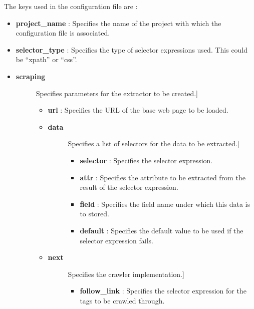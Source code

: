 \documentclass[letterpaper,12pt,english]{sphinxmanual}
\begin{document}
The keys used in the configuration file are :
\begin{itemize}
\item {} 
\textbf{project\_name} : Specifies the name of the project with which the configuration file is associated.

\item {} 
\textbf{selector\_type} : Specifies the type of selector expressions used. This could be ``xpath'' or ``css''.

\item {} \begin{description}
\item[{\textbf{scraping}}] \leavevmode{[}Specifies parameters for the extractor to be created.{]}\begin{itemize}
\item {} 
\textbf{url} : Specifies the URL of the base web page to be loaded.

\item {} \begin{description}
\item[{\textbf{data}}] \leavevmode{[}Specifies a list of selectors for the data to be extracted.{]}\begin{itemize}
\item {} 
\textbf{selector} : Specifies the selector expression.

\item {} 
\textbf{attr} : Specifies the attribute to be extracted from the result of the selector expression.

\item {} 
\textbf{field} : Specifies the field name under which this data is to stored.

\item {} 
\textbf{default} : Specifies the default value to be used if the selector expression fails.

\end{itemize}

\end{description}

\item {} \begin{description}
\item[{\textbf{next}}] \leavevmode{[}Specifies the crawler implementation.{]}\begin{itemize}
\item {} 
\textbf{follow\_link} : Specifies the selector expression for the  tags to be crawled through.

\end{itemize}

\end{description}

\end{itemize}

\end{description}

\end{itemize}
\end{document}
